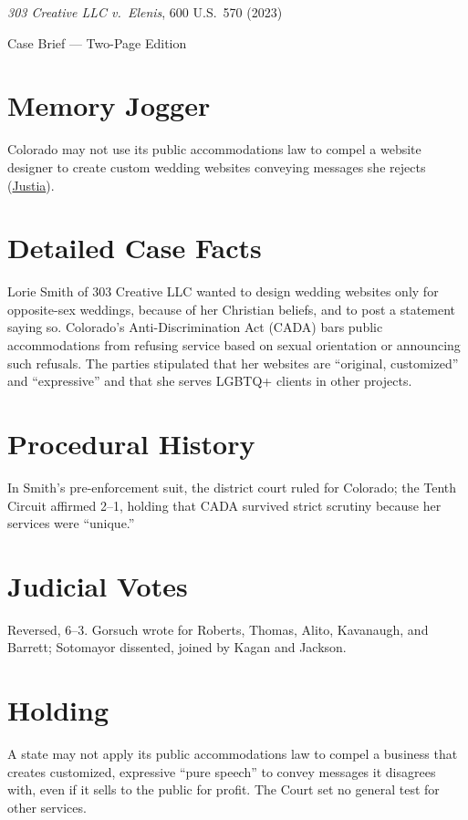 \documentclass[12pt]{article}
\begin{document}
\begin{center}
{\LARGE \textit{303 Creative LLC v.\ Elenis}, 600 U.S.\ 570 (2023)\par}
\vspace{0.5em}
{\large Case Brief --- Two-Page Edition\par}
\end{center}

\section{Memory Jogger}
Colorado may not use its public accommodations law to compel a website designer to create custom wedding websites conveying messages she rejects (\href{https://supreme.justia.com/cases/federal/us/600/21-476/}{Justia}).

\section{Detailed Case Facts}
Lorie Smith of 303 Creative LLC wanted to design wedding websites only for opposite-sex weddings, because of her Christian beliefs, and to post a statement saying so. Colorado's Anti-Discrimination Act (CADA) bars public accommodations from refusing service based on sexual orientation or announcing such refusals. The parties stipulated that her websites are ``original, customized'' and ``expressive'' and that she serves LGBTQ+ clients in other projects.

\section{Procedural History}
In Smith's pre-enforcement suit, the district court ruled for Colorado; the Tenth Circuit affirmed 2--1, holding that CADA survived strict scrutiny because her services were ``unique.''

\section{Judicial Votes}
Reversed, 6--3. Gorsuch wrote for Roberts, Thomas, Alito, Kavanaugh, and Barrett; Sotomayor dissented, joined by Kagan and Jackson.

\section{Holding}
A state may not apply its public accommodations law to compel a business that creates customized, expressive ``pure speech'' to convey messages it disagrees with, even if it sells to the public for profit. The Court set no general test for other services.
\end{document}

